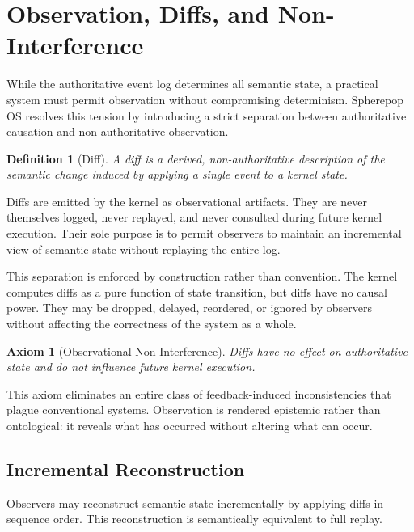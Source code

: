 \documentclass[11pt]{article}
\newtheorem{definition}{Definition}[section]
\newtheorem{axiom}{Axiom}[section]
\begin{document}
\section{Observation, Diffs, and Non-Interference}

While the authoritative event log determines all semantic state, a practical
system must permit observation without compromising determinism. Spherepop
OS resolves this tension by introducing a strict separation between
authoritative causation and non-authoritative observation.

\begin{definition}[Diff]
A diff is a derived, non-authoritative description of the semantic change
induced by applying a single event to a kernel state.
\end{definition}

Diffs are emitted by the kernel as observational artifacts. They are never
themselves logged, never replayed, and never consulted during future kernel
execution. Their sole purpose is to permit observers to maintain an
incremental view of semantic state without replaying the entire log.

This separation is enforced by construction rather than convention. The
kernel computes diffs as a pure function of state transition, but diffs have
no causal power. They may be dropped, delayed, reordered, or ignored by
observers without affecting the correctness of the system as a whole.

\begin{axiom}[Observational Non-Interference]
Diffs have no effect on authoritative state and do not influence future
kernel execution.
\end{axiom}

This axiom eliminates an entire class of feedback-induced inconsistencies
that plague conventional systems. Observation is rendered epistemic rather
than ontological: it reveals what has occurred without altering what can
occur.

\subsection{Incremental Reconstruction}

Observers may reconstruct semantic state incrementally by applying diffs in
sequence order. This reconstruction is semantically equivalent to full
replay.
\end{document}
